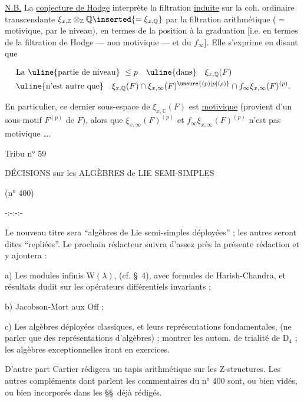 \uline{N.B.} La \uline{conjecture de Hodge} interprète la filtration \uline{induite} sur la coh. ordinaire transcendante $\xi_{x,\mathbb{Z}}\otimes_{\mathbb{Z}}\mathbb{Q}\inserted{=\xi_{x,\mathbb{Q}}}$ par la filtration arithmétique ($=$ motivique, par le niveau), en termes de la position  à la graduation [i.e. en termes de la filtration de Hodge --- non motivique --- et du $f_\infty$]. Elle s’exprime en disant que


\[
\begin{aligned}
&\text{La \uline{partie de niveau}}\ \leq p\quad\text{\uline{dans}}\quad\xi_{x,\mathbb{Q}}(F)\\
&\text{\uline{n’est autre que}}\quad \xi_{x,\mathbb{Q}}(F)\cap\xi_{x,\infty}(F)^{\unsure{(p)|p|(\rho)}}\cap f_\infty\xi_{x,\infty}(F)^{(p)}.
\end{aligned}
\]

En particulier, ce dernier sous-espace de $\xi_{x,\mathbb{C}}(F)$ est \uline{motivique} (provient d’un  sous-motif $F^{(p)}$ de $F$), alors que $\xi_{x,\infty}(F)^{(p)}$ et $f_\infty\xi_{x,\infty}(F)^{(p)}$ n’est pas motivique \ldots. 

Tribu n° 59

DÉCISIONS sur les ALGÈBRES de LIE SEMI-SIMPLES

(n° 400)

-:-:-:-

Le nouveau titre sera ``algèbres de Lie semi-simples déployées'' ; les autres seront dites ``repliées''. Le prochain rédacteur suivra d'assez près la présente rédaction et y ajoutera :

a) Les modules infinis $\mathrm{W}(\lambda)$, (cf. \S\ 4), avec formules de Harish-Chandra, et résultats dudit sur les opérateurs différentiels invariants ;

b) Jacobson-Mort aux Off ;

c) Les algèbres déployées classiques, et leurs représentations fondamentales, (ne parler que des représentations d'algèbres) ; montrer les autom. de trialité de $\mathrm{D}_4$ ; les algèbres exceptionnelles iront en exercices.

D'autre part Cartier rédigera un tapis arithmétique sur les $\mathrm{Z}$-structures. Les autres compléments dont parlent les commentaires du n° 400 sont, ou bien vidés, ou bien incorporés dans les \S\S\ déjà rédigés.

